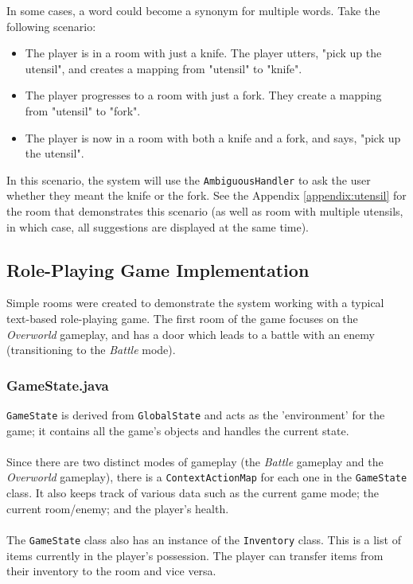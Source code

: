 \documentclass[11pt]{article}
\begin{document}
In some cases, a word could become a synonym for multiple words. Take the following scenario:

\begin{itemize}
\item The player is in a room with just a knife. The player utters, "pick up the utensil", and creates a mapping from "utensil" to "knife".

\item The player progresses to a room with just a fork. They create a mapping from "utensil" to "fork".

\item The player is now in a room with both a knife and a fork, and says, "pick up the utensil".
\end{itemize}

In this scenario, the system will use the \texttt{AmbiguousHandler} to ask the user whether they meant the knife or the fork. See the Appendix \ref{appendix:utensil} for the room that demonstrates this scenario (as well as room with multiple utensils, in which case, all suggestions are displayed at the same time).

\subsection{Role-Playing Game Implementation}

Simple rooms were created to demonstrate the system working with a typical text-based role-playing game. The first room of the game focuses on the \textit{Overworld} gameplay, and has a door which leads to a battle with an enemy (transitioning to the \textit{Battle} mode).

\subsubsection{GameState.java}

\texttt{GameState} is derived from \texttt{GlobalState} and acts as the 'environment' for the game; it contains all the game's objects and handles the current state.
\\
\\
Since there are two distinct modes of gameplay (the \textit{Battle} gameplay and the \textit{Overworld} gameplay), there is a \texttt{ContextActionMap} for each one in the \texttt{GameState} class. It also keeps track of various data such as the current game mode; the current room/enemy; and the player's health.
\\
\\
The \texttt{GameState} class also has an instance of the \texttt{Inventory} class. This is a list of items currently in the player's possession. The player can transfer items from their inventory to the room and vice versa.
\end{document}
